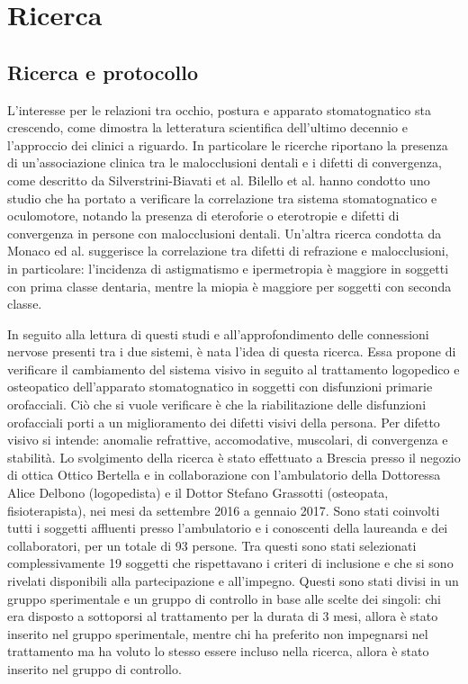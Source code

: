 \chapter{Ricerca}
\section{Ricerca e protocollo}

L’interesse per le relazioni tra occhio, postura e apparato stomatognatico sta crescendo, come dimostra la letteratura
scientifica dell’ultimo decennio e l’approccio dei clinici a riguardo. In particolare le ricerche riportano la presenza di
un’associazione clinica tra le malocclusioni dentali e i difetti di convergenza, come descritto da Silverstrini-Biavati et al.\cite{bib12}
Bilello et al. hanno condotto uno studio che ha portato a verificare la correlazione tra sistema stomatognatico e
oculomotore, notando la presenza di eteroforie o eterotropie e difetti di convergenza in persone con malocclusioni
dentali\cite{bib13}. Un’altra ricerca condotta da Monaco ed al. suggerisce la correlazione tra difetti di refrazione e malocclusioni,
in particolare: l’incidenza di astigmatismo e ipermetropia è maggiore in soggetti con prima classe dentaria, mentre la
miopia è maggiore per soggetti con seconda classe\cite{bib14}.

In seguito alla lettura di questi studi e all’approfondimento delle connessioni nervose presenti tra i due sistemi, è nata l’idea di questa ricerca. Essa propone di verificare il cambiamento del sistema visivo in seguito al trattamento logopedico e osteopatico dell’apparato stomatognatico in soggetti con disfunzioni primarie orofacciali. Ciò che si vuole verificare è che la riabilitazione delle disfunzioni orofacciali porti a un miglioramento dei difetti visivi della persona. 
Per difetto visivo si intende: anomalie refrattive, accomodative, muscolari, di convergenza e stabilità. Lo svolgimento della ricerca è stato effettuato a Brescia presso il negozio di ottica Ottico Bertella e in collaborazione con l’ambulatorio della Dottoressa Alice Delbono (logopedista) e il Dottor Stefano Grassotti (osteopata, fisioterapista), nei mesi da settembre 2016 a gennaio 2017. Sono stati coinvolti tutti i soggetti affluenti presso l’ambulatorio e i conoscenti della laureanda e dei collaboratori, per un totale di 93 persone. Tra questi sono stati selezionati complessivamente 19 soggetti che rispettavano i criteri di inclusione e che si sono rivelati disponibili alla partecipazione e all’impegno. Questi sono stati divisi in un gruppo sperimentale e un gruppo di controllo in base alle scelte dei singoli: chi era disposto a sottoporsi al trattamento per la durata di 3 mesi, allora è stato inserito nel gruppo sperimentale, mentre chi ha preferito non impegnarsi nel trattamento ma ha voluto lo stesso essere incluso nella ricerca, allora è stato inserito nel gruppo di controllo.

